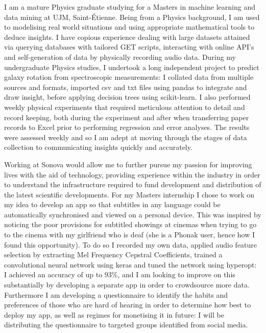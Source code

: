 \documentclass[11pt, a4paper]{awesome-cv}
\begin{document}
\makecvheader

\makelettertitle

\begin{cvletter}
I am a mature Physics graduate studying for a Masters in machine learning and data mining at UJM, Saint-Étienne. Being from a Physics background, I am used to modelising real world situations and using appropriate mathematical tools to deduce insights. 
I have copious experience dealing with large datasets attained via querying databases with tailored GET scripts, interacting with online API’s and self-generation of data by physically recording audio data.  During my undergraduate Physics studies, I undertook a long independent project to predict galaxy rotation from spectroscopic measurements: I collated data from multiple sources and formats, imported csv and txt files using pandas to integrate and draw insight, before applying decision trees using scikit-learn. I also performed weekly physical experiments that required meticulous attention to detail and record keeping, both during the experiment and after when transferring paper records to Excel prior to performing regression and error analyses. The results were assessed weekly and so I am adept at moving through the stages of data collection to communicating insights quickly and accurately.

Working at Sonova would allow me to further pursue my passion for improving lives with the aid of technology, providing experience within the industry in order to understand the infrastructure required to fund development and distribution of the latest scientific developments. For my Masters internship I chose to work on my idea to develop an app so that subtitles in any language could be automatically synchronised and viewed on a personal device. This was inspired by noticing the poor provisions for subtitled showings at cinemas when trying to go to the cinema with my girlfriend who is deaf (she is a Phonak user, hence how I found this opportunity). To do so I recorded my own data, applied audio feature selection by extracting Mel Frequency Cepstral Coefficients, trained a convolutional neural network using keras and tuned the network using hyperopt: I achieved an accuracy of up to 93\%, and I am looking to improve on this substantially by developing a separate app in order to crowdsource more data. Furthermore I am developing a questionnaire to identify the habits and preferences of those who are hard of hearing in order to determine how best to deploy my app, as well as regimes for monetising it in future: I will be distributing the questionnaire to targeted groups identified from social media.


\end{cvletter}
\end{document}
